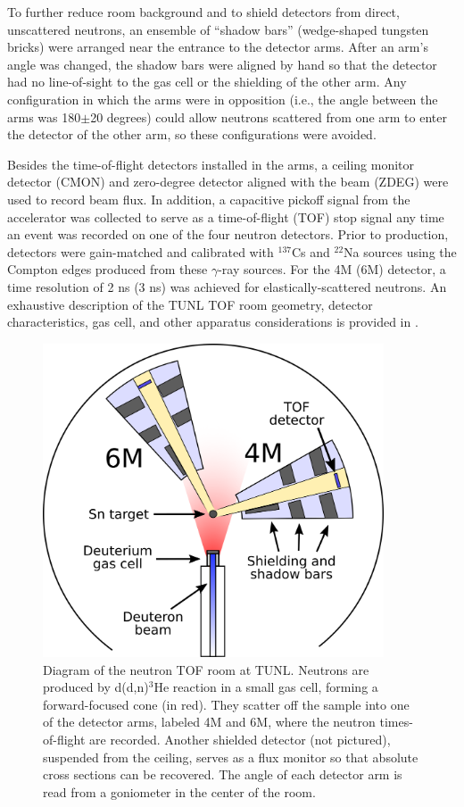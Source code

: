 To further reduce room background and to shield detectors from direct,
unscattered neutrons,
an ensemble of ``shadow bars'' (wedge-shaped tungsten bricks)
were arranged near the entrance to the detector arms. After an arm's
angle was changed, the shadow bars were aligned by hand so that the
detector had no line-of-sight to the gas cell or the
shielding of the other arm. Any configuration in which the arms were in opposition (i.e., the
angle between the arms was 180$\pm$20 degrees) could allow neutrons scattered
from one arm to enter the detector of the other arm, so these configurations were avoided.

Besides the time-of-flight detectors installed in the arms, a ceiling monitor
detector (CMON) and zero-degree detector aligned with the beam (ZDEG) were used
to record beam flux. In addition, a capacitive pickoff signal
from the accelerator was collected to serve as a time-of-flight
(TOF) stop signal any time an event was recorded on one of the four neutron
detectors. Prior to production, detectors were gain-matched and calibrated with $^{137}$Cs
and $^{22}$Na sources using the Compton edges produced from these $\gamma$-ray sources. For the
4M (6M) detector, a time resolution of 2 ns (3 ns) was achieved for
elastically-scattered neutrons.
An exhaustive description of the TUNL TOF room geometry, detector characteristics,
gas cell, and other apparatus considerations is provided in \cite{GussPhDThesis}.
\begin{figure}[tb]
    \centering
    \includegraphics[width = 0.9\textwidth]{figures/ExperimentalSetupTUNL.png}
    \caption[Diagram of the neutron TOF room at TUNL] 
    {
        Diagram of the neutron TOF room at TUNL. Neutrons are produced by d(d,n)$^{3}$He reaction in
        a small gas cell, forming a forward-focused cone (in red). They scatter
        off the sample into one of the detector arms, labeled 4M and 6M, where the neutron
        times-of-flight are recorded. Another shielded detector (not pictured), suspended from the 
        ceiling, serves as a flux monitor so that absolute cross sections can be
        recovered. The angle of each detector arm is read from a goniometer in
        the center of the room.
    }
    \label{ExperimentalSetupTUNL}
\end{figure}

